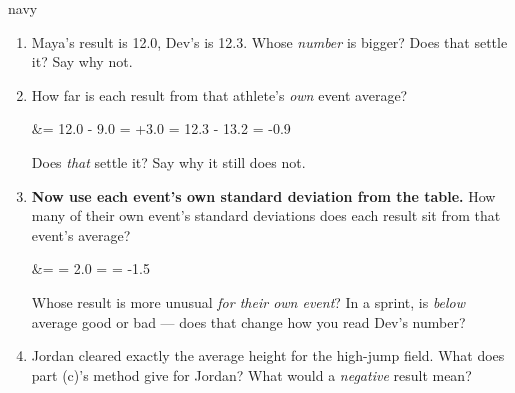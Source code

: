 \begin{scenariobox}{navy}
\vspace{2pt}
\normalsize
\begin{enumerate}[label=\textbf{\alph*.}, leftmargin=1.8em, itemsep=4pt]
  \item Maya's result is 12.0, Dev's is 12.3. Whose \emph{number} is bigger? 
        Does that settle it? Say why not.
  \item How far is each result from that athlete's \emph{own} event average?
        \begin{work}
         &= 12.0 - 9.0 = +3.0  \qquad
         = 12.3 - 13.2 = -0.9 
        \end{work}
        Does \emph{that} settle it?  Say why it still does not.
  \item \textbf{Now use each event's own standard deviation from the table.} How many of their
        own event's standard deviations does each result sit from that event's average?
        \begin{work}
         &=  = 2.0 \qquad
         =  = -1.5
        \end{work}
        Whose result is more unusual \emph{for their own event}? In a sprint, is \emph{below}
        average good or bad --- does that change how you read Dev's number?
  \item Jordan cleared exactly the average height for the high-jump field. What does part (c)'s
        method give for Jordan?  What would a \emph{negative} result mean?
\end{enumerate}
\end{scenariobox}

